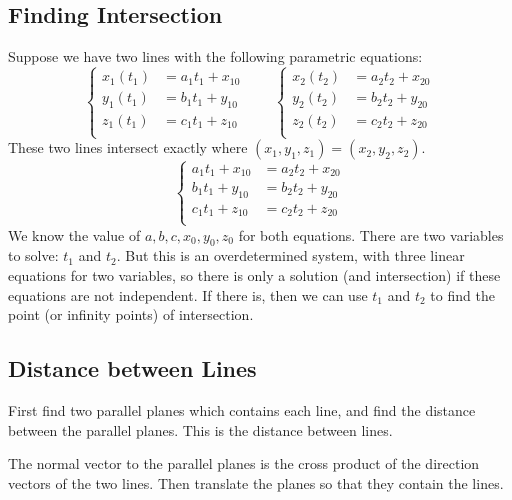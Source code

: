 \documentclass{article}
\begin{document}
\subsection{Finding Intersection}
Suppose we have two lines with the following parametric equations:
\begin{equation*}
	\left\{\begin{aligned}
		x_1(t_1)&=a_1t_1+x_{10} \\
		y_1(t_1)&=b_1t_1+y_{10} \\
		z_1(t_1)&=c_1t_1+z_{10} \\
	\end{aligned}\right.
	\qquad
	\left\{\begin{aligned}
		x_2(t_2)&=a_2t_2+x_{20} \\
		y_2(t_2)&=b_2t_2+y_{20} \\
		z_2(t_2)&=c_2t_2+z_{20} \\
	\end{aligned}\right.
\end{equation*}
These two lines intersect exactly where $(x_1,y_1,z_1)=(x_2,y_2,z_2)$.
\begin{equation*}
	\left\{\begin{aligned}
		a_1t_1+x_{10}&=a_2t_2+x_{20} \\
		b_1t_1+y_{10}&=b_2t_2+y_{20} \\
		c_1t_1+z_{10}&=c_2t_2+z_{20} \\
	\end{aligned}\right.
\end{equation*}
We know the value of $a,b,c,x_0,y_0,z_0$ for both equations. There are two variables to solve: $t_1$ and $t_2$. But this is an overdetermined system, with three linear equations for two variables, so there is only a solution (and intersection) if these equations are not independent. If there is, then we can use $t_1$ and $t_2$ to find the point (or infinity points) of intersection.

\subsection{Distance between Lines}

First find two parallel planes which contains each line, and find the distance between the parallel planes. This is the distance between lines.

The normal vector to the parallel planes is the cross product of the direction vectors of the two lines. Then translate the planes so that they contain the lines.
\end{document}
